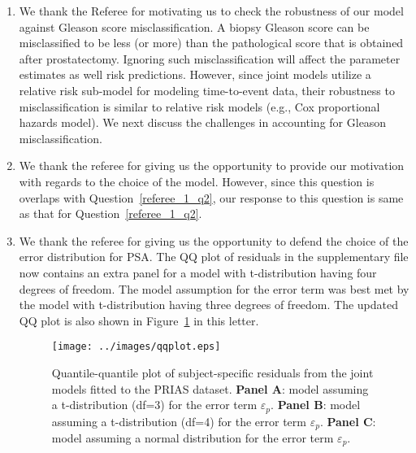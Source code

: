 \begin{enumerate}
\item \textbf{}

We thank the Referee for motivating us to check the robustness of our model against Gleason score misclassification. A biopsy Gleason score can be misclassified to be less (or more) than the pathological score that is obtained after prostatectomy. Ignoring such misclassification will affect the parameter estimates as well risk predictions. However, since joint models utilize a relative risk sub-model for modeling time-to-event data, their robustness to misclassification is similar to relative risk models (e.g., Cox proportional hazards model). We next discuss the challenges in accounting for Gleason misclassification. 

\item \textbf{\color{blue}{In the supplement B.2, Eq(6), it is unclear why this particular function form is selected. Did the authors do any model selection? Any rationale for this model?}}

We thank the referee for giving us the opportunity to provide our motivation with regards to the choice of the model. However, since this question is overlaps with Question~\ref{referee_1_q2}, our response to this question is same as that for Question~\ref{referee_1_q2}.

\item \textbf{\color{blue}{In the supplement B.4, the Q-Q plot of df=4 should also be provided so that the reviewer can see why df=3 is selected.}}

We thank the referee for giving us the opportunity to defend the choice of the error distribution for PSA. The QQ plot of residuals in the supplementary file now contains an extra panel for a model with t-distribution having four degrees of freedom. The model assumption for the error term was best met by the model with t-distribution having three degrees of freedom. The updated QQ plot is also shown in Figure~\ref{fig:qqplot} in this letter.

\begin{figure}[!htb]
\centerline{\texttt{[image: ../images/qqplot.eps]}}
\caption{Quantile-quantile plot of subject-specific residuals from the joint models fitted to the PRIAS dataset. \textbf{Panel A}: model assuming a t-distribution (df=3) for the error term $\varepsilon_p$. \textbf{Panel B}: model assuming a t-distribution (df=4) for the error term $\varepsilon_p$. \textbf{Panel C}: model assuming a normal distribution for the error term $\varepsilon_p$.}
\label{fig:qqplot}
\end{figure}


\end{enumerate}
